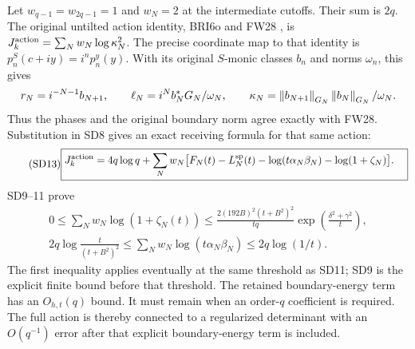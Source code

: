 Let $w_{q-1}=w_{2q-1}=1$ and $w_N=2$ at the intermediate cutoffs.
Their sum is $2q$. The original untilted action identity, BRI6o and
FW28 \cite{osd:FW}, is $J_k^{\rm action}=\sum_Nw_N\log\kappa_N^2$.
The precise coordinate map to that identity is
$p_n^S(c+iy)=i^np_n^y(y)$. With its original $S$-monic classes $b_n$
and norms $\omega_n$, this gives
\[
r_N=i^{-N-1}b_{N+1},\qquad
\ell_N=i^N b_N^*G_N/\omega_N,\qquad
\kappa_N=\left\lVert b_{N+1}\right\rVert_{G_N}\left\lVert b_N\right\rVert_{G_N}/\omega_N.
\]
Thus the phases and the original boundary norm agree exactly with FW28.
Substitution in SD8 gives an exact receiving formula for that same
action:
\begin{equation}\tag{SD13}
\boxed{\begin{aligned}
J_k^{\rm action}={}&4q\log q+
\sum_Nw_N\bigl[F_N(t)-L_N^{\rm sp}(t)
-\log(t\alpha_N\beta_N)-\log(1+\zeta_N)\bigr].
\end{aligned}}
\end{equation}
SD9--11 prove
\begin{equation}\tag{SD14}
\begin{gathered}
0\le\sum_Nw_N\log(1+\zeta_N(t))
\le\frac{2(192B)^2(t+B^2)^2}{tq}
\exp\!\left(\frac{\delta^2+\gamma^2}{t}\right),\\
2q\log\frac{t}{(t+B^2)^2}
\le\sum_Nw_N\log(t\alpha_N\beta_N)
\le2q\log(1/t).
\end{gathered}
\end{equation}
The first inequality applies eventually at the same threshold as SD11;
SD9 is the explicit finite bound before that threshold. The retained
boundary-energy term has an $O_{h,t}(q)$ bound. It must remain when an
order-$q$ coefficient is required. The full action is thereby connected
to a regularized determinant with an $O(q^{-1})$ error after that
explicit boundary-energy term is included.

